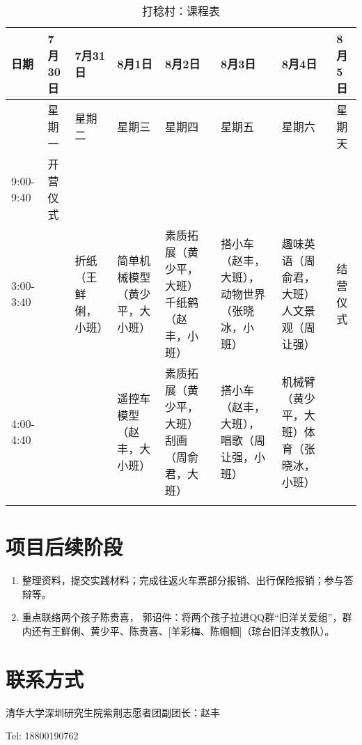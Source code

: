 \documentclass[12pt]{ctexart}
\def\CurriculumScheduleWidth{1.6cm}
\begin{document}
\begin{longtable}{|p{\CurriculumScheduleWidth}|p{\CurriculumScheduleWidth}|p{\CurriculumScheduleWidth}|p{\CurriculumScheduleWidth}|p{\CurriculumScheduleWidth}|p{\CurriculumScheduleWidth}|p{\CurriculumScheduleWidth}|p{\CurriculumScheduleWidth}|}
\hline
日期 & 7月30日 & 7月31日 & 8月1日 & 8月2日 & 8月3日 & 8月4日 & 8月5日 \\
\hline
& 星期一 & 星期二 & 星期三 & 星期四 & 星期五 & 星期六 & 星期天 \\
\hline
9:00-9:40 & 开营仪式 &   & &  & &  &   \\
\hline
3:00-3:40  &  & 折纸（王鲜俐，小班） &  简单机械模型（黄少平，大小班） & 素质拓展（黄少平，大班）千纸鹤（赵丰，小班） & 搭小车（赵丰，大班），动物世界（张晓冰，小班） & 趣味英语（周俞君，大班）人文景观（周让强） &  结营仪式 \\
\hline
4:00-4:40  &  & & 遥控车模型（赵丰，大小班）  & 素质拓展（黄少平，大班）刮画（周俞君，大班） & 搭小车（赵丰，大班），唱歌（周让强，小班） & 机械臂（黄少平，大班）体育（张晓冰，小班） & \\
\hline
\caption{打稔村：课程表}\label{curriculum_schedule}
\end{longtable}

\section{项目后续阶段}
\begin{enumerate}
\item 整理资料，提交实践材料；完成往返火车票部分报销、出行保险报销；参与答辩等。
\item 重点联络两个孩子陈贵喜， 郭诏件：将两个孩子拉进QQ群“旧洋关爱组”，群内还有王鲜俐、黄少平、陈贵喜、[羊彩梅、陈帼帼]（琼台旧洋支教队）。
\end{enumerate}
\section{联系方式}
清华大学深圳研究生院紫荆志愿者团副团长：赵丰

Tel: 18800190762
\end{document}

